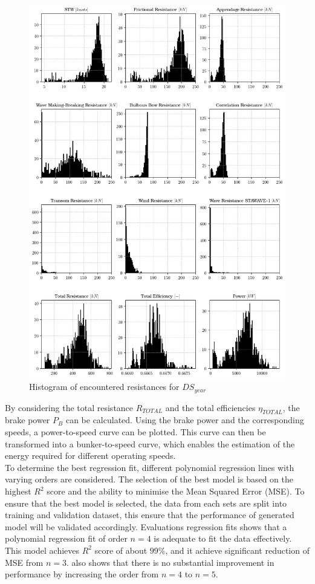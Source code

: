 \begin{figure}[h!]
    \centering
    \includegraphics[width=.9\linewidth]{02_figures/resistance_power_hist.png}
    \caption{Histogram of encountered resistances for $DS_{year}$}
    \label{fig:hist_resistance_power_yr}
\end{figure}

By considering the total resistance $R_{TOTAL}$ and the total efficiencies $\eta_{TOTAL}$, the brake power $P_B$ can be calculated. Using the brake power and the corresponding speeds, a power-to-speed curve can be plotted. This curve can then be transformed into a bunker-to-speed curve, which enables the estimation of the energy required for different operating speeds.\\ 

To determine the best regression fit, different polynomial regression lines with varying orders are considered. The selection of the best model is based on the highest $R^2$ score and the ability to minimise the Mean Squared Error (MSE). To ensure that the best model is selected, the data from each sets are split into training and validation dataset, this ensure that the performance of generated model will be validated accordingly. Evaluations regression fits shows that a polynomial regression fit of order $n=4$ is adequate to fit the data effectively. This model achieves $R^2$ score of about $99\%$, and it achieve significant reduction of MSE from $n=3$.  also shows that there is no substantial improvement in performance by increasing the order from $n=4$ to $n=5$.\\

